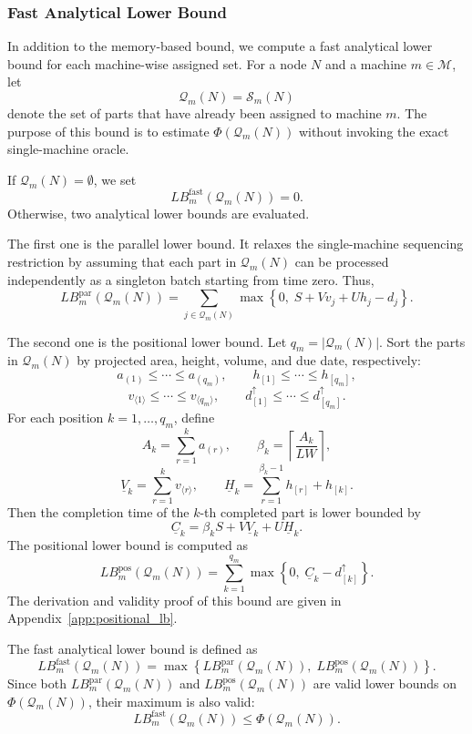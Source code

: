 \documentclass[letterpaper, 10 pt, conference]{ieeeconf}  %
\begin{document}
\subsubsection{Fast Analytical Lower Bound}
\label{subsubsec:fast_analytical_lb}

In addition to the memory-based bound, we compute a fast analytical lower
bound for each machine-wise assigned set. For a node $N$ and a machine
$m\in\mathcal{M}$, let
\[
\mathcal{Q}_m(N)=\mathcal{S}_m(N)
\]
denote the set of parts that have already been assigned to machine $m$.
The purpose of this bound is to estimate
$\Phi(\mathcal{Q}_m(N))$ without invoking the exact single-machine oracle.

If $\mathcal{Q}_m(N)=\emptyset$, we set
\[
LB_m^{\mathrm{fast}}(\mathcal{Q}_m(N))=0.
\]
Otherwise, two analytical lower bounds are evaluated.

The first one is the parallel lower bound. It relaxes the single-machine
sequencing restriction by assuming that each part in $\mathcal{Q}_m(N)$ can
be processed independently as a singleton batch starting from time zero.
Thus,
\[
LB_m^{\mathrm{par}}(\mathcal{Q}_m(N))
=
\sum_{j\in\mathcal{Q}_m(N)}
\max
\left\{
0,\;
S+Vv_j+Uh_j-d_j
\right\}.
\]

The second one is the positional lower bound. Let
$q_m=|\mathcal{Q}_m(N)|$. Sort the parts in $\mathcal{Q}_m(N)$ by projected
area, height, volume, and due date, respectively:
\[
a_{(1)} \le \cdots \le a_{(q_m)},\qquad
h_{[1]} \le \cdots \le h_{[q_m]},
\]
\[
v_{\langle 1\rangle} \le \cdots \le v_{\langle q_m\rangle},\qquad
d_{[1]}^{\uparrow} \le \cdots \le d_{[q_m]}^{\uparrow}.
\]
For each position $k=1,\dots,q_m$, define
\[
A_k=\sum_{r=1}^{k}a_{(r)},
\qquad
\beta_k=\left\lceil\frac{A_k}{LW}\right\rceil,
\]
\[
\underline{V}_k=\sum_{r=1}^{k}v_{\langle r\rangle},
\qquad
\underline{H}_k=
\sum_{r=1}^{\beta_k-1}h_{[r]}+h_{[k]}.
\]
Then the completion time of the $k$-th completed part is lower bounded by
\[
\underline{C}_k
=
\beta_k S
+
V\underline{V}_k
+
U\underline{H}_k.
\]
The positional lower bound is computed as
\[
LB_m^{\mathrm{pos}}(\mathcal{Q}_m(N))
=
\sum_{k=1}^{q_m}
\max
\left\{
0,\;
\underline{C}_k-d_{[k]}^{\uparrow}
\right\}.
\]
The derivation and validity proof of this bound are given in
Appendix~\ref{app:positional_lb}.

The fast analytical lower bound is defined as
\[
LB_m^{\mathrm{fast}}(\mathcal{Q}_m(N))
=
\max
\left\{
LB_m^{\mathrm{par}}(\mathcal{Q}_m(N)),
\;
LB_m^{\mathrm{pos}}(\mathcal{Q}_m(N))
\right\}.
\]
Since both $LB_m^{\mathrm{par}}(\mathcal{Q}_m(N))$ and
$LB_m^{\mathrm{pos}}(\mathcal{Q}_m(N))$ are valid lower bounds on
$\Phi(\mathcal{Q}_m(N))$, their maximum is also valid:
\[
LB_m^{\mathrm{fast}}(\mathcal{Q}_m(N))
\le
\Phi(\mathcal{Q}_m(N)).
\]
\end{document}
